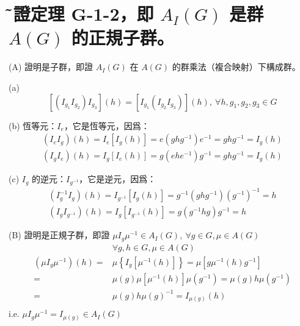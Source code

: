 \documentclass{article}
\begin{document}
\section{\~ 試證定理 G-1-2，即 $A_I(G)$ 是群 $A(G)$ 的正規子群。}
\begin{framed}
  (A) 證明是子群，即證 $A_I(G)$ 在 $A(G)$ 的群乘法（複合映射）下構成群。

  (a)
  $$
    [(I_{g_1}I_{g_2})I_{g_3}](h)=[I_{g_1}(I_{g_2}I_{g_3})](h),\ \forall h,g_1,g_2,g_3\in G
  $$

  (b) 恆等元：$I_e$，它是恆等元，因爲：
  $$\begin{aligned}
      (I_eI_g)(h)=I_e[I_g(h)]=e(ghg^{-1})e^{-1}=ghg^{-1}=I_g(h) \\
      (I_gI_e)(h)=I_g[I_e(h)]=g(ehe^{-1})g^{-1}=ghg^{-1}=I_g(h)
    \end{aligned}
  $$

  (c) $I_g$ 的逆元：$I_{g^{-1}}$，它是逆元，因爲：
  $$\begin{aligned}
      (I_g^{-1}I_g)(h)=I_{g^{-1}}[I_g(h)]=g^{-1}(ghg^{-1})(g^{-1})^{-1}=h \\
      (I_gI_{g^{-1}})(h)=I_{g}[I_{g^{-1}}(h)]=g(g^{-1}hg)g^{-1}=h
    \end{aligned}
  $$

  (B) 證明是正規子群，即證 $\mu I_g\mu^{-1}\in A_I(G),\ \forall g\in G,\mu\in A(G)$
  $$\begin{aligned}
                                                                & \forall g,h\in G,\mu\in A(G)                                                                                                                                 \\
      \left( {\mu {I_g}{\mu ^{ - 1}}} \right)\left( h \right) = & \mu \left\{ {{I_g}\left[ {{\mu ^{ - 1}}\left( h \right)} \right]} \right\} = \mu \left[ {g{\mu ^{ - 1}}\left( h \right){g^{ - 1}}} \right]                   \\
      =                                                         & \mu \left( g \right)\mu \left[ {{\mu ^{ - 1}}\left( h \right)} \right]\mu \left( {{g^{ - 1}}} \right) = \mu \left( g \right)h\mu \left( {{g^{ - 1}}} \right) \\
      =                                                         & \mu \left( g \right)h\mu {\left( g \right)^{ - 1}} = {I_{\mu \left( g \right)}}\left( h \right)                                                              \\
    \end{aligned} $$
  i.e. $\mu I_g\mu^{-1}=I_{\mu(g)}\in A_I(G)$
\end{framed}
\end{document}
